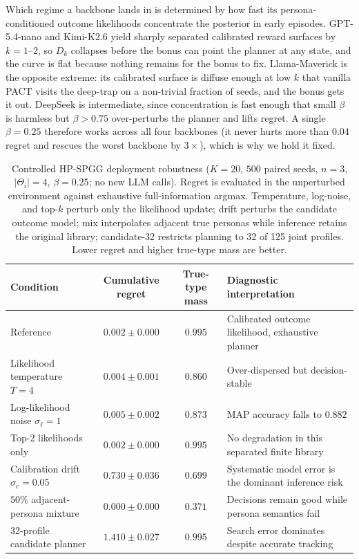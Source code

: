\documentclass{article}
\begin{document}
Which regime a backbone lands in is determined by how fast its persona-conditioned outcome likelihoods concentrate the posterior in early episodes. GPT-5.4-nano and Kimi-K2.6 yield sharply separated calibrated reward surfaces by $k{=}1$--$2$, so $D_k$ collapses before the bonus can point the planner at any state, and the curve is flat because nothing remains for the bonus to fix. Llama-Maverick is the opposite extreme: its calibrated surface is diffuse enough at low $k$ that vanilla PACT visits the deep-trap on a non-trivial fraction of seeds, and the bonus gets it out. DeepSeek is intermediate, since concentration is fast enough that small $\beta$ is harmless but $\beta>0.75$ over-perturbs the planner and lifts regret. A single $\beta=0.25$ therefore works across all four backbones (it never hurts more than $0.04$ regret and rescues the worst backbone by $3\times$), which is why we hold it fixed.

\begin{table}[t]
\centering\small
\caption{Controlled HP-SPGG deployment robustness ($K{=}20$, $500$ paired seeds, $n{=}3$, $|\Theta_i|{=}4$, $\beta{=}0.25$; no new LLM calls). Regret is evaluated in the unperturbed environment against exhaustive full-information argmax. Temperature, log-noise, and top-$k$ perturb only the likelihood update; drift perturbs the candidate outcome model; mix interpolates adjacent true personas while inference retains the original library; candidate-32 restricts planning to 32 of 125 joint profiles. Lower regret and higher true-type mass are better.}
\label{tab:deployment-robustness-main}
\begin{tabular}{lccp{5.2cm}}
\toprule
Condition & Cumulative regret & True-type mass & Diagnostic interpretation \\
\midrule
Reference & $0.002\pm0.000$ & $0.995$ & Calibrated outcome likelihood, exhaustive planner \\
Likelihood temperature $T{=}4$ & $0.004\pm0.001$ & $0.860$ & Over-dispersed but decision-stable \\
Log-likelihood noise $\sigma_\ell{=}1$ & $0.005\pm0.002$ & $0.873$ & MAP accuracy falls to $0.882$ \\
Top-$2$ likelihoods only & $0.002\pm0.000$ & $0.995$ & No degradation in this separated finite library \\
Calibration drift $\sigma_c{=}0.05$ & $0.730\pm0.036$ & $0.699$ & Systematic model error is the dominant inference risk \\
$50\%$ adjacent-persona mixture & $0.000\pm0.000$ & $0.371$ & Decisions remain good while persona semantics fail \\
32-profile candidate planner & $1.410\pm0.027$ & $0.995$ & Search error dominates despite accurate tracking \\
\bottomrule
\end{tabular}
\end{table}
\end{document}
